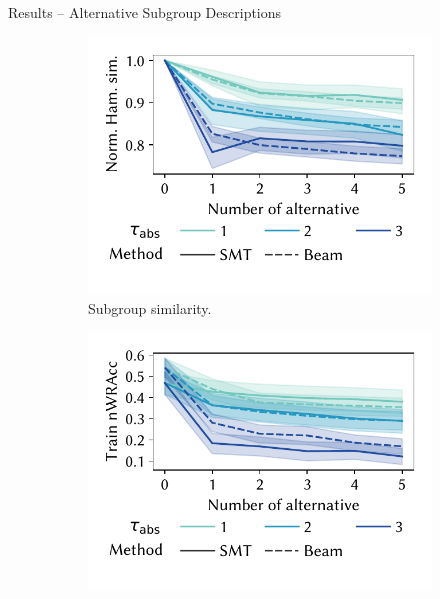 \documentclass[en, navbaroff, handout]{sdqbeamer}
\begin{document}
\begin{frame}[t]{Results -- Alternative Subgroup Descriptions}
	\begin{figure}
		\centering
		\begin{subfigure}[t]{0.4\textwidth}
			\centering
			\includegraphics[width=\textwidth, trim=10 25 10 10, clip]{plots/csd-alternatives-hamming.pdf}
			\caption{Subgroup similarity.}
			\label{fig:csd:alternatives-hamming}
		\end{subfigure}
		\hspace{\kitcolumnsep}
		\begin{subfigure}[t]{0.4\textwidth}
			\centering
			\includegraphics[width=\textwidth, trim=10 25 10 10, clip]{plots/csd-alternatives-train-nwracc.pdf}

\end{subfigure}
\end{figure}
\end{frame}
\end{document}
